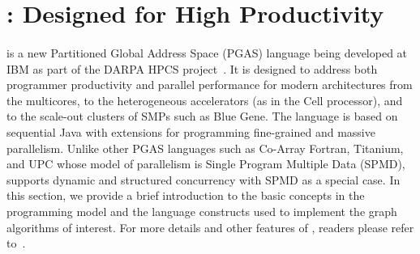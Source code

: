 \section{\Xten{}: Designed for High Productivity}\label{s:x10}
\paragraph{}\Xten{} is a new Partitioned Global Address Space (PGAS) language being developed at IBM as part of the DARPA HPCS project~\cite{X10-OOPSLA05}. It is designed to address both programmer productivity and parallel performance for modern architectures from the multicores, to the heterogeneous accelerators (as in the Cell processor), and to the scale-out clusters of SMPs such as Blue Gene.  The language is based on sequential Java with extensions for programming fine-grained and massive parallelism. Unlike other PGAS languages such as Co-Array Fortran, Titanium, and UPC whose model of parallelism is Single Program Multiple Data (SPMD), \Xten{} supports dynamic and structured concurrency with SPMD as a special case. In this section, we provide a brief introduction to the basic concepts in the \Xten{} programming model and the language constructs used to implement the graph algorithms of interest. For more details and other features of \Xten{}, readers please refer to~\cite{X10-OOPSLA05}.
 
